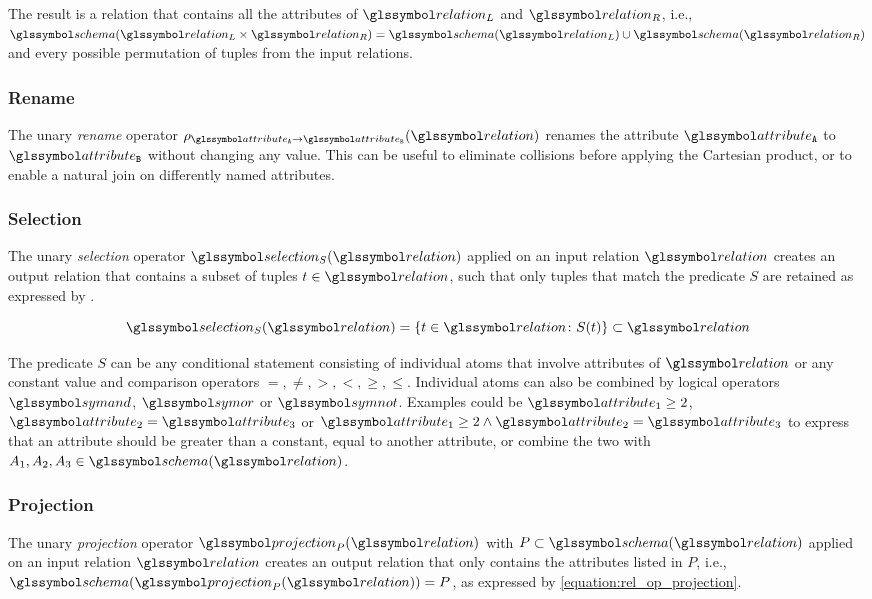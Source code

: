 The result is a relation that contains all the attributes of $\relation_L$ and $\relation_R$, i.e., $\schema(\relation_L \times \relation_R) = \schema(\relation_L) \cup \schema(\relation_R)$ and every possible permutation of tuples from the input relations.

\subsubsection{Rename}
The unary \emph{rename} operator $\rho_{\attribute_\mathtt{A} \rightarrow \attribute_\mathtt{B}}(\relation)$ renames the attribute $\attribute_\mathtt{A}$ to $\attribute_\mathtt{B}$ without changing any value. This can be useful to eliminate collisions before applying the Cartesian product, or to enable a natural join on differently named attributes.

\subsubsection{Selection}

The unary \emph{selection} operator $\selection_{S}(\relation)$ applied on an input relation $\relation$ creates an output relation that contains a subset of tuples $t \in \relation$, such that only tuples that match the predicate $S$ are retained as expressed by .

\begin{equation}
    \label{equation:rel_op_selection}
    \selection_{S}(\relation) = \{ t \in \relation \colon S(t) \} \subset \relation
\end{equation}

The predicate $S$ can be any conditional statement consisting of individual atoms that involve attributes of $\relation$ or any constant value and comparison operators $=,\neq,>,<,\geq, \leq$. Individual atoms can also be combined by logical operators $\symand$, $\symor$ or $\symnot$. Examples could be $\attribute_1 \geq 2$, $\attribute_2 = \attribute_3$ or $\attribute_1 \geq 2 \wedge \attribute_2 = \attribute_3$ to express that an attribute should be greater than a constant, equal to another attribute, or combine the two with $A_1,A_2,A_3 \in \schema(\relation)$.


\subsubsection{Projection}
The unary \emph{projection} operator $\projection_{P}(\relation)$ with $P \subset \schema(\relation)$ applied on an input relation $\relation$ creates an output relation that only contains the attributes listed in $P$, i.e., $\schema(\projection_{P}(\relation)) = P$, as expressed by \cref{equation:rel_op_projection}.

